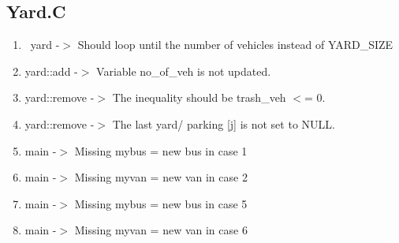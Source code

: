 \subsection{Yard.C}
\begin{enumerate}
\item ~yard -$>$ Should loop until the number of vehicles instead of YARD\_SIZE
\item yard::add -$>$ Variable no\_of\_veh is not updated.
\item yard::remove -$>$ The inequality should be trash\_veh $<$= 0. 
\item yard::remove -$>$ The last yard/ parking [j] is not set to NULL.
\item main -$>$ Missing mybus = new bus in case 1
\item main -$>$ Missing myvan = new van in case 2
\item main -$>$ Missing mybus = new bus in case 5
\item main -$>$ Missing myvan = new van in case 6
\end{enumerate}



